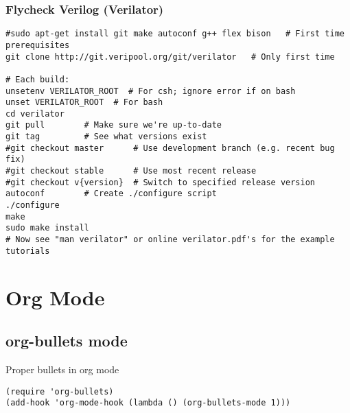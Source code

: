 \documentclass[11pt]{article}
\begin{document}
\subsubsection{Flycheck Verilog (Verilator)}
\label{sec-3-3-3}
\begin{verbatim}
#sudo apt-get install git make autoconf g++ flex bison   # First time prerequisites
git clone http://git.veripool.org/git/verilator   # Only first time

# Each build:
unsetenv VERILATOR_ROOT  # For csh; ignore error if on bash
unset VERILATOR_ROOT  # For bash
cd verilator
git pull        # Make sure we're up-to-date
git tag         # See what versions exist
#git checkout master      # Use development branch (e.g. recent bug fix)
#git checkout stable      # Use most recent release
#git checkout v{version}  # Switch to specified release version
autoconf        # Create ./configure script
./configure
make
sudo make install
# Now see "man verilator" or online verilator.pdf's for the example tutorials
\end{verbatim}
\section{Org Mode}
\label{sec-4}
\subsection{org-bullets mode}
\label{sec-4-1}
Proper bullets in org mode
\begin{verbatim}
(require 'org-bullets)
(add-hook 'org-mode-hook (lambda () (org-bullets-mode 1)))
\end{verbatim}
\end{document}
